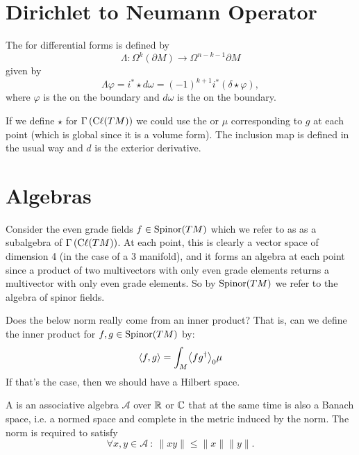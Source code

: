 \section{Dirichlet to Neumann Operator}

The  for differential forms is defined by
\[
\Lambda \colon \Omega^k(\partial M) \to \Omega^{n-k-1}{\partial M}
\]
given by
\[
\Lambda \varphi = i^* \star d \omega=(-1)^{k+1}i^*(\delta \star \varphi),
\]
where $\varphi$ is the  on the boundary and $d\omega$ is the  on the boundary.

If we define $\star$ for $\Gamma\left(\mathrm{C}\ell(TM)\right)$ we could use the  or  $\mu$ corresponding to $g$ at each point (which is global since it is a volume form). The inclusion map is defined in the usual way and $d$ is the exterior derivative.  

\section{Algebras}
Consider the even grade fields $f\in \mathrm{Spinor}(TM)$ which we refer to as  as a subalgebra of $\Gamma\left(\mathrm{C}\ell(TM)\right)$.  At each point, this is clearly a vector space of dimension 4 (in the case of a 3 manifold), and it forms an algebra at each point since a product of two multivectors with only even grade elements returns a multivector with only even grade elements.  So by $\mathrm{Spinor}(TM)$ we refer to the algebra of spinor fields.

\begin{question}
Does the below norm really come from an inner product? That is, can we define the inner product for $f,g\in \mathrm{Spinor}(TM)$ by:
\[
\langle f,g\rangle = \int_M \projzero{fg^\dagger} \mu
\]
If that's the case, then we should have a Hilbert space.
\end{question}

\begin{definition}
A  is an associative algebra $\mathcal{A}$ over $\mathbb{R}$ or $\mathbb{C}$ that at the same time is also a Banach space, i.e. a normed space and complete in the metric induced by the norm. The norm is required to satisfy
\[
\forall x,y \in \mathcal{A}~\colon~ \|xy\|\leq \|x\|\|y\|.
\]
\end{definition}

